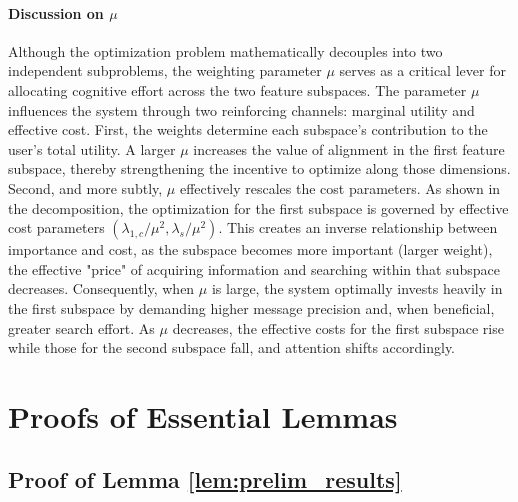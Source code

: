 \documentclass[12pt]{article}
\theoremstyle{definition}
\theoremstyle{remark}
\begin{document}
\paragraph{Discussion on $\mu$} Although the optimization problem mathematically decouples into two independent subproblems, the weighting parameter $\mu$ serves as a critical lever for allocating cognitive effort across the two feature subspaces. The parameter $\mu$ influences the system through two reinforcing channels: marginal utility and effective cost. First, the weights determine each subspace’s contribution to the user’s total utility. A larger $\mu$ increases the value of alignment in the first feature subspace, thereby strengthening the incentive to optimize along those dimensions. Second, and more subtly, $\mu$ effectively rescales the cost parameters. As shown in the decomposition, the optimization for the first subspace is governed by effective cost parameters $(\lambda_{1,c}/\mu^2, \lambda_s/\mu^2)$. This creates an inverse relationship between importance and cost, as the subspace becomes more important (larger weight), the effective "price" of acquiring information and searching within that subspace decreases. Consequently, when $\mu$ is large, the system optimally invests heavily in the first subspace by demanding higher message precision and, when beneficial, greater search effort. As $\mu$ decreases, the effective costs for the first subspace rise while those for the second subspace fall, and attention shifts accordingly.

\section{Proofs of Essential Lemmas}

\subsection{Proof of Lemma \ref{lem:prelim_results}}
\label{sec:proof_lem_prelims}
\end{document}
